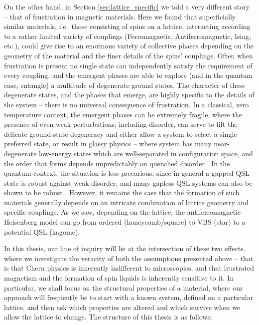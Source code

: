 On the other hand, in Section \ref{sec:lattice_specific} we told a very different story -- that of frustration in magnetic materials. Here we found that superficially similar materials, i.e.~those consisting of spins on a lattice, interacting according to a rather limited variety of couplings (Ferromagnetic, Antiferromagnetic, Ising, etc.), could give rise to an enormous variety of collective phases depending on the geometry of the material and the finer details of the spins' couplings. Often when frustration is present no single state can independently satisfy the requirement of every coupling, and the emergent phases are able to explore (and in the quantum case, entangle) a multitude of degenerate ground states. The character of these degenerate states, and the phases that emerge, are highly specific to the details of the system -- there is no universal consequence of frustration. In a classical, zero temperature context, the emergent phases can be extremely fragile, where the presence of even weak perturbations, including disorder, can serve to lift the delicate ground-state degeneracy and either allow a system to select a single preferred state, or result in glassy physics -- where system has many near-degenerate low-energy states which are well-separated in configuration space, and the order that forms depends unpredictably on quenched disorder \cite{edwards_theory_1975,binder_spin_1986}. In the quantum context, the situation is less precarious, since in general a gapped QSL state is robust against weak disorder, and many gapless QSL systems can also be shown to be robust \cite{savary_quantum_2017}. However, it remains the case that the formation of such materials generally depends on an intricate combination of lattice geometry and specific couplings. As we saw, depending on the lattice, the antiferromagnetic Heisenberg model can go from ordered (honeycomb/square) to VBS (star) to a potential QSL (kagome).

In this thesis, our line of inquiry will lie at the intersection of these two effects, where we investigate the veracity of both the assumptions presented above -- that is that Chern physics is inherently indifferent to microscopics, and that frustrated magnetism and the formation of spin liquids is inherently sensitive to it. In particular, we shall focus on the structural properties of a material, where our approach will frequently be to start with a known system, defined on a particular lattice, and then ask which properties are altered and which survive when we allow the lattice to change. The structure of this thesis is as follows:

